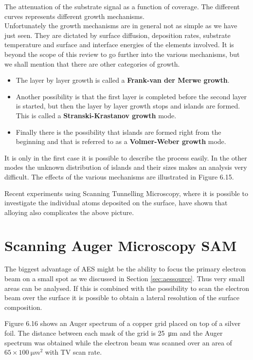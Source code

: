            The attenuation of the substrate
          signal as a  function  of  coverage.  The  different  curves
          represents different growth mechanisms.\\

Unfortunately the growth mechanisms are in general not as simple as we have just seen. They are dictated by surface diffusion, deposition rates, substrate temperature and surface and interface energies of the elements involved. It is beyond the scope of this review to go further into the various mechanisms, but we shall mention that there are other categories of growth.

\begin{itemize}
\item The layer by layer growth is called a {\bf Frank-van der Merwe growth}.
\item Another possibility is that the first layer is completed before the second layer is started, but then the layer by layer growth stops and islands are formed. This is called a {\bf Stranski-Krastanov growth} mode.
\item Finally there is the possibility that islands are formed right from the beginning and that is referred to as a {\bf Volmer-Weber growth} mode.
\end{itemize}

It is only in the first case it is possible to describe the process easily. In the other modes the unknown distribution of islands and their sizes makes an analysis very difficult. The effects of the various mechanisms are illustrated in Figure 6.15.

Recent experiments using Scanning Tunnelling Microscopy, where it is possible to investigate the individual atoms deposited on the surface, have shown that alloying also complicates the above picture.

\section{Scanning Auger Microscopy SAM}
The biggest advantage of AES might be the ability to focus the primary electron beam on a small spot as we discussed in Section  \ref{sec:aessource}. Thus very small areas can be analysed. If this is combined with the possibility to scan the electron beam over the surface it is possible to obtain a lateral resolution of the surface composition.

Figure 6.16 shows an Auger spectrum of a copper grid placed on top of a silver foil. The distance between each mask of the grid is \SI{25}{\micro m} and the Auger spectrum was obtained while the electron beam was scanned over an area of $65\times\SI{100}{\micro m^2}$ with TV scan rate.\\

